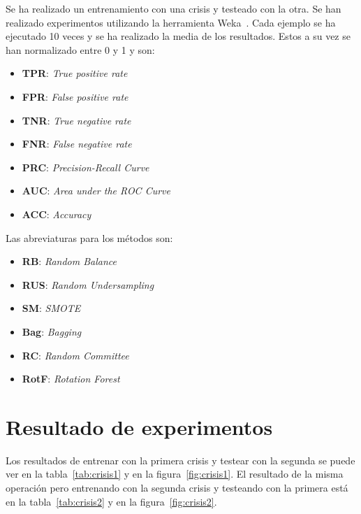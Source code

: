 \documentclass[a4paper,12pt,twoside,oldfontcommands]{memoir}
\begin{document}
Se ha realizado un entrenamiento con una crisis y testeado con la otra. Se han realizado experimentos utilizando la herramienta Weka~\cite{hall2009weka}. Cada ejemplo se ha ejecutado 10 veces y se ha realizado la media de los resultados. Estos a su vez se han normalizado entre 0 y 1 y son: 
\begin{itemize}
    \item \textbf{TPR}: \textit{True positive rate}
    \item \textbf{FPR}: \textit{False positive rate}
    \item \textbf{TNR}: \textit{True negative rate}
    \item \textbf{FNR}: \textit{False negative rate}
    \item \textbf{PRC}: \textit{Precision-Recall Curve}
    \item \textbf{AUC}: \textit{Area under the ROC Curve}
    \item \textbf{ACC}: \textit{Accuracy}
\end{itemize}

Las abreviaturas para los métodos son:

\begin{itemize}
    \item \textbf{RB}: \textit{Random Balance}
    \item \textbf{RUS}: \textit{Random Undersampling}
    \item \textbf{SM}: \textit{SMOTE}
    \item \textbf{Bag}: \textit{Bagging}
    \item \textbf{RC}: \textit{Random Committee}
    \item \textbf{RotF}: \textit{Rotation Forest}
\end{itemize}

\section{Resultado de experimentos}

Los resultados de entrenar con la primera crisis y testear con la segunda se puede ver en la tabla~\ref{tab:crisis1} y en la figura~\ref{fig:crisis1}. El resultado de la misma operación pero entrenando con la segunda crisis y testeando con la primera está en la tabla~\ref{tab:crisis2} y en la figura~\ref{fig:crisis2}.
\end{document}
